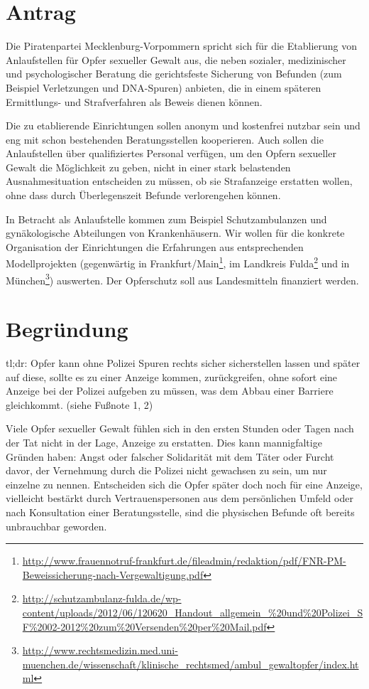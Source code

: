 \section{Antrag}

Die Piratenpartei Mecklenburg-Vorpommern spricht sich für die Etablierung von Anlaufstellen für Opfer sexueller Gewalt aus, die neben sozialer, medizinischer und psychologischer Beratung die gerichtsfeste Sicherung von Befunden (zum Beispiel Verletzungen und DNA-Spuren) anbieten, die in einem späteren Ermittlungs- und Strafverfahren als Beweis dienen können.

Die zu etablierende Einrichtungen sollen anonym und kostenfrei nutzbar sein und eng mit schon bestehenden Beratungsstellen kooperieren. Auch sollen die Anlaufstellen über qualifiziertes Personal verfügen, um den Opfern sexueller Gewalt die Möglichkeit zu geben, nicht in einer stark belastenden Ausnahmesituation entscheiden zu müssen, ob sie Strafanzeige erstatten wollen, ohne dass durch Überlegenszeit Befunde verlorengehen können.

In Betracht als Anlaufstelle kommen zum Beispiel Schutzambulanzen und gynäkologische Abteilungen von Krankenhäusern. Wir wollen für die konkrete Organisation der Einrichtungen die Erfahrungen aus entsprechenden Modellprojekten (gegenwärtig in Frankfurt/Main\footnote{\url{http://www.frauennotruf-frankfurt.de/fileadmin/redaktion/pdf/FNR-PM-Beweissicherung-nach-Vergewaltigung.pdf}}, im Landkreis Fulda\footnote{\url{http://schutzambulanz-fulda.de/wp-content/uploads/2012/06/120620\_Handout\_allgemein\_\%20und\%20Polizei\_SF\%2002-2012\%20zum\%20Versenden\%20per\%20Mail.pdf}} und in München\footnote{\url{http://www.rechtsmedizin.med.uni-muenchen.de/wissenschaft/klinische\_rechtsmed/ambul\_gewaltopfer/index.html}}) auswerten. Der Opferschutz soll aus Landesmitteln finanziert werden.

\section{Begründung}

tl;dr: Opfer kann ohne Polizei Spuren rechts sicher sicherstellen lassen und später auf diese, sollte es zu einer Anzeige kommen, zurückgreifen, ohne sofort eine Anzeige bei der Polizei aufgeben zu müssen, was dem Abbau einer Barriere gleichkommt. (siehe Fußnote 1, 2)

Viele Opfer sexueller Gewalt fühlen sich in den ersten Stunden oder Tagen nach der Tat nicht in der Lage, Anzeige zu erstatten. Dies kann mannigfaltige Gründen haben: Angst oder falscher Solidarität mit dem Täter oder Furcht davor, der Vernehmung durch die Polizei nicht gewachsen zu sein, um nur einzelne zu nennen. Entscheiden sich die Opfer später doch noch für eine Anzeige, vielleicht bestärkt durch Vertrauenspersonen aus dem persönlichen Umfeld oder nach Konsultation einer Beratungsstelle, sind die physischen Befunde oft bereits unbrauchbar geworden.

